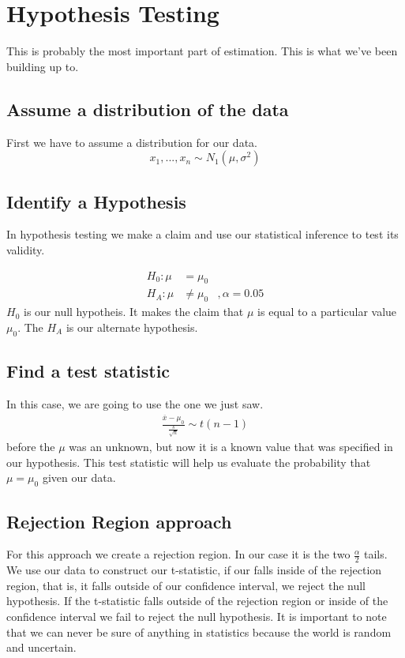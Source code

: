 \section{Hypothesis Testing}

This is probably the most important part of estimation. This is what we've been building up to.
\subsection{Assume a distribution of the data}
First we have to assume a distribution for our data.
\[x_1,...,x_n \sim N_1(\mu,\sigma^2)\]

\subsection{Identify a Hypothesis}
In hypothesis testing we make a claim and use our statistical inference to test its validity.

\begin{align*}
    H_0: \mu &= \mu_0 \\
    H_A: \mu &\neq \mu_0  &, \alpha = 0.05
\end{align*}
$H_0$ is our null hypotheis. It makes the claim that $\mu$ is equal to a particular value $\mu_0$. The $H_A$ is our alternate hypothesis.
\subsection{Find a test statistic}
In this case, we are going to use the one we just saw.
\begin{gather*}
    \frac{\overline{x}-\mu_0}{\frac{s}{\sqrt{n}}}\sim t(n-1)
\end{gather*}
before the $\mu$ was an unknown, but now it is a known value that was specified in our hypothesis. This test statistic will help us evaluate the probability that $\mu = \mu_0$ given our data.

\subsection{Rejection Region approach}
For this approach we create a rejection region. In our case it is the two $\frac{\alpha}{2}$ tails. We use our data to construct our t-statistic, if our falls inside of the rejection region, that is, it falls outside of our confidence interval, we reject the null hypothesis. If the t-statistic falls outside of the rejection region or inside of the confidence interval we fail to reject the null hypothesis. It is important to note that we can never be sure of anything in statistics because the world is random and uncertain.

